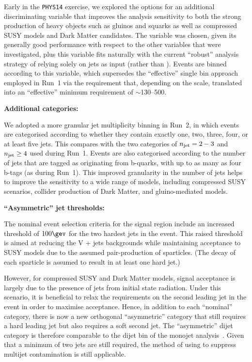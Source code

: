 Early in the \texttt{PHYS14} exercise, we explored the options for an
additional discriminating variable that improves the analysis
sensitivity to both the strong production of heavy objects such as
gluinos and squarks as well as compressed SUSY models and Dark Matter
candidates. The variable \mht was chosen, given its generally good
performance with respect to the other variables that were
investigated, plus this variable fits naturally with the current
``robust'' analysis strategy of relying solely on jets as input
(rather than \eg \met). Events are binned according to this
variable, which supersedes the ``effective'' single bin approach
employed in Run~1 via the \alphat requirement that, depending on the
\HT scale, translated into an ``effective'' minimum \mht requirement
of $\sim$130--500\gev.

{\bf Additional \njet categories:}

We adopted a more granular jet multiplicity binning in Run~2, in
which events are categorised according to whether they contain
exactly one, two, three, four, or at least five jets. This compares with
the two categories of $n_{\text{jet}} = 2-3$ and $n_{\text{jet}} \geq 4$ used during
Run~1. Events are also categorised according to the number of jets
that are tagged as originating from b-quarks, with up to as many as
four b-tags (as during Run~1). This improved granularity in the number of
jets helps to improve the sensitivity to a wide range of models,
including compressed SUSY scenarios, collider production of Dark
Matter, and gluino-mediated models.

{\bf ``Asymmetric'' jet \Pt thresholds:}

The nominal event selection criteria for the signal region include an increased
 threshold of $100\gev$ for the two hardest jets in the
event. This raised threshold is aimed at reducing the V + jets
backgrounds while maintaining acceptance to SUSY models due to the
assumed pair-production of sparticles. (The decay of each
sparticle is assumed to result in at least one hard jet.) 

However, for compressed SUSY and Dark Matter models, signal acceptance
is largely due to the presence of jets from initial state
radiation. Under this scenario, it is beneficial to relax the
requirements on the second leading jet in the event in order to
maximise acceptance. Hence, in addition to each ``nominal'' \njet
category, there is now a new orthogonal ``asymmetric'' \njet category
that still requires a hard leading jet but also requires a soft second
jet. The ``asymmetric'' dijet category is therefore comparable to the
dijet bin of the monojet analysis~\cite{Chatrchyan:2011nd,
Chatrchyan:2012me, Khachatryan:2014rra}. Given that a minimum of two
jets are still required, the method of using \alphat to suppress
multijet contamination is still applicable.

